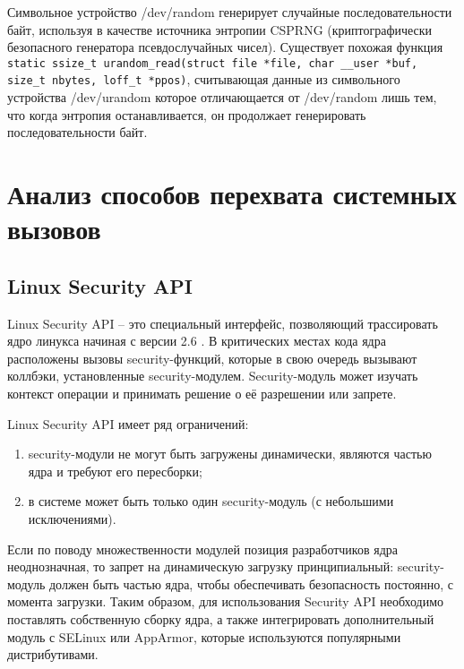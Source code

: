 	 	Символьное устройство /dev/random генерирует случайные последовательности байт, 
		используя в качестве источника энтропии CSPRNG (криптографически безопасного генератора псевдослучайных чисел).
		Существует похожая функция \lstinline{static ssize_t urandom_read(struct file *file, char __user *buf, size_t nbytes, loff_t *ppos)},
		считывающая данные из символьного устройства 
		/dev/urandom которое отличающается от /dev/random лишь тем, что
		когда энтропия останавливается, он продолжает генерировать последовательности байт. 

\section{Анализ способов перехвата системных вызовов}

	\subsection*{Linux Security API}
		Linux Security API -- это специальный интерфейс, позволяющий трассировать ядро линукса начиная с версии 2.6 \cite{lsm}.
		В критических местах кода ядра расположены вызовы security-функций, которые в свою очередь вызывают коллбэки,
		установленные security-модулем.
		Security-модуль может изучать контекст операции и принимать решение о её разрешении или запрете.

		Linux Security API имеет ряд ограничений:
		\begin{enumerate}
			\item security-модули не могут быть загружены динамически, являются частью ядра и требуют его пересборки;
			\item в системе может быть только один security-модуль (с небольшими исключениями).
		\end{enumerate}

		Если по поводу множественности модулей позиция разработчиков ядра неоднозначная, 
		то запрет на динамическую загрузку принципиальный: security-модуль должен быть частью ядра,
		чтобы обеспечивать безопасность постоянно, с момента загрузки. 
		Таким образом, для использования Security API необходимо поставлять собственную сборку ядра,
		а также интегрировать дополнительный модуль с SELinux или AppArmor, 
		которые используются популярными дистрибутивами.

